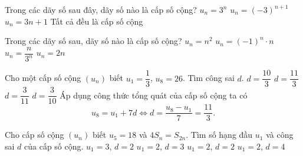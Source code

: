 \begin{ex}%
	Trong các dãy số sau đây, dãy số nào là cấp số cộng?	
	\choice
	{$u_n=3^n$}
	{$u_n=(-3)^{n+1}$}
	{\True $u_n=3n + 1$}
	{Tất cả đều là cấp số cộng}
\end{ex}%
\begin{ex}%
	Trong các dãy số sau, dãy số nào là cấp số cộng?
	\choice
	{$u_n=n^2$}
	{$u_n=(-1)^n \cdot n$}
	{$u_n= \dfrac{n}{3^n}$}
	{\True $u_n=2n$}
\end{ex}%
\begin{ex}%
	Cho một cấp số cộng $(u_n)$ biết $u_1=\dfrac{1}{3}$, $u_8=26$. Tìm công sai $d$.
	\choice
	{$d=\dfrac{10}{3}$}
	{\True $d=\dfrac{11}{3}$}
	{$d=\dfrac{3}{11}$}
	{$d=\dfrac{3}{10}$}
	\loigiai
	{Áp dụng công thức tổng quát của cấp số cộng ta có
	$$u_8=u_1+7d\Leftrightarrow d=\dfrac{u_8-u_1}{7}=\dfrac{11}{3}.$$}
\end{ex}%
\begin{ex}%
	Cho cấp số cộng $(u_n)$ biết $u_5=18$ và $4S_n=S_{2n}$. Tìm số hạng đầu $u_1$ và công sai $d$ của cấp số cộng.
	\choice 
	{$u_1=3$, $d=2$}
	{$u_1=2$, $d=3$}
	{$u_1=2$, $d=2$}
	{\True $u_1=2$, $d=4$}   
\end{ex}%
